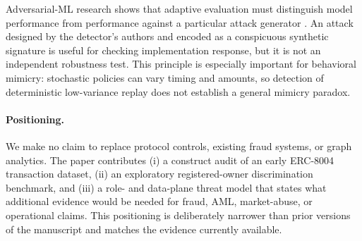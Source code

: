 Adversarial-ML research shows that adaptive evaluation must distinguish model
performance from performance against a particular attack generator
\cite{biggio2013,biggio2018,cartella2021}.  An attack designed by the detector's
authors and encoded as a conspicuous synthetic signature is useful for checking
implementation response, but it is not an independent robustness test.  This
principle is especially important for behavioral mimicry: stochastic policies
can vary timing and amounts, so detection of deterministic low-variance replay
does not establish a general mimicry paradox.

\paragraph{Positioning.}
We make no claim to replace protocol controls, existing fraud systems, or graph
analytics.  The paper contributes (i) a construct audit of an early ERC-8004
transaction dataset, (ii) an exploratory registered-owner discrimination
benchmark, and (iii) a role- and data-plane threat model that states what
additional evidence would be needed for fraud, AML, market-abuse, or operational
claims.  This positioning is deliberately narrower than prior versions of the
manuscript and matches the evidence currently available.
